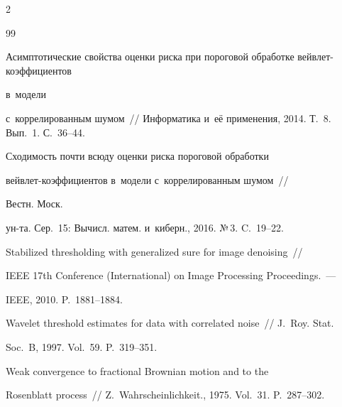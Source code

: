 \begin{multicols}{2}
{{\begin{thebibliography}{99}


Асимптотические свойства оценки риска при пороговой обработке вейв\-лет-ко\-эф\-фи\-ци\-ен\-тов 

в~модели

с~коррелированным шумом~// Информатика и~её применения, 2014. Т.~8. Вып.~1. С.~36--44.




 Сходимость почти всюду оценки рис\-ка пороговой обработки 

вейв\-лет-ко\-эф\-фи\-ци\-ен\-тов в~модели с~коррелированным шумом~// 

Вестн. Моск.

\linebreak\vspace*{-12pt}



\pagebreak



\noindent

 ун-та. Сер.~15: Вычисл. матем. и~киберн., 2016. №\,3. C.~19--22.





Stabilized thresholding with generalized sure for image denoising~// 

IEEE 17th  Conference (International) on Image Processing Proceedings.~--- 

IEEE, 2010. P.~1881--1884.





Wavelet threshold estimates for data with correlated noise~// J.~Roy. Stat.

Soc.~B, 1997. Vol.~59. P.~319--351.





 Weak convergence to fractional Brownian motion and to the 

Rosenblatt process~// Z.~Wahrscheinlichkeit., 1975. Vol.~31. P.~287--302.





\end{thebibliography}}}
\end{multicols}
